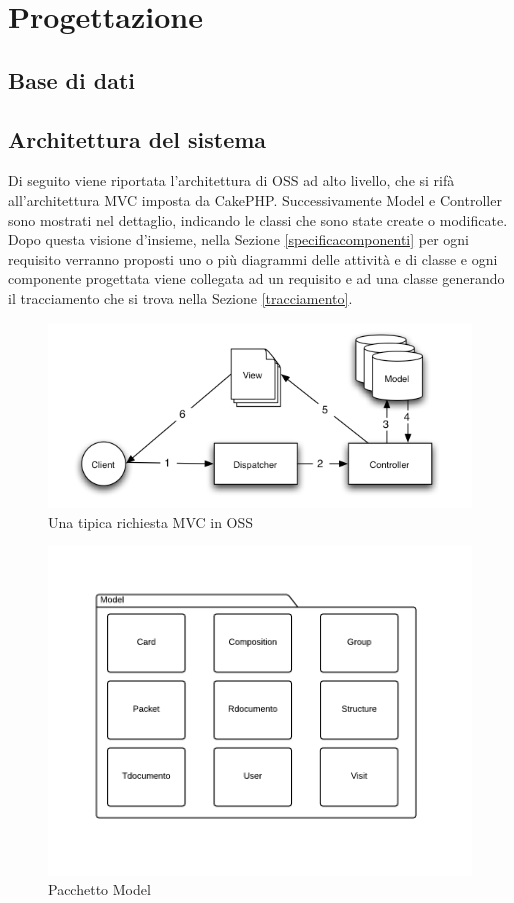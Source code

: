\section{Progettazione}\label{progettazione}
\subsection{Base di dati}


\subsection{Architettura del sistema}
Di seguito viene riportata l'architettura di OSS ad alto livello, che si rifà all'architettura MVC imposta da CakePHP. 
Successivamente Model e Controller sono mostrati nel dettaglio, indicando le classi che sono state create o modificate. \\

Dopo questa visione d'insieme, nella Sezione \ref{specificacomponenti} per ogni requisito verranno proposti uno o più diagrammi delle attività e di classe e ogni  componente progettata viene collegata ad un requisito e ad una classe generando il tracciamento che si trova nella Sezione \ref{tracciamento}.

\begin{figure}[H]
\centering
\includegraphics[width=1\textwidth]{images/basic_mvc.png}
\caption{Una tipica richiesta MVC in OSS}
\end{figure}

\begin{figure}[H]
\centering
\includegraphics[width=1\textwidth]{images/model.png}
\caption{Pacchetto Model}
\end{figure}

